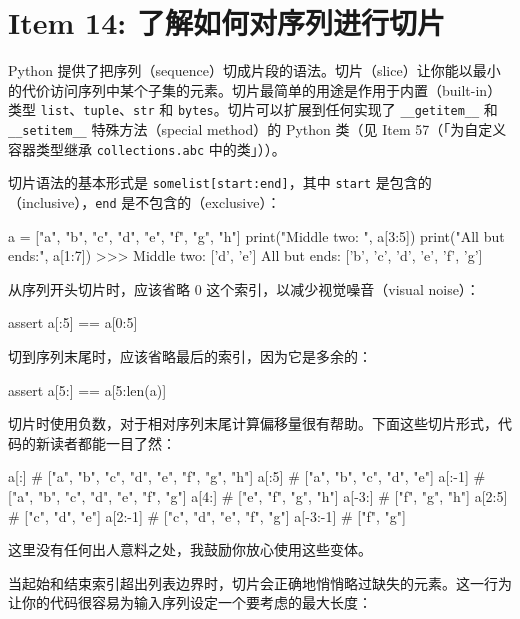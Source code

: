 \section{Item 14: 了解如何对序列进行切片}

Python 提供了把序列（sequence）切成片段的语法。切片（slice）让你能以最小的代价访问序列中某个子集的元素。切片最简单的用途是作用于内置（built-in）类型 \texttt{list}、\texttt{tuple}、\texttt{str} 和 \texttt{bytes}。切片可以扩展到任何实现了 \texttt{\_\_getitem\_\_} 和 \texttt{\_\_setitem\_\_} 特殊方法（special method）的 Python 类（见 Item 57（「为自定义容器类型继承 \texttt{collections.abc} 中的类」））。

切片语法的基本形式是 \texttt{somelist[start:end]}，其中 \texttt{start} 是包含的（inclusive），\texttt{end} 是不包含的（exclusive）：

\begin{codebox}[python]
a = ["a", "b", "c", "d", "e", "f", "g", "h"]
print("Middle two:  ", a[3:5])
print("All but ends:", a[1:7])
>>>
Middle two:   ['d', 'e']
All but ends: ['b', 'c', 'd', 'e', 'f', 'g']
\end{codebox}

从序列开头切片时，应该省略 0 这个索引，以减少视觉噪音（visual noise）：

\begin{codebox}[python]
assert a[:5] == a[0:5]
\end{codebox}

切到序列末尾时，应该省略最后的索引，因为它是多余的：

\begin{codebox}[python]
assert a[5:] == a[5:len(a)]
\end{codebox}

切片时使用负数，对于相对序列末尾计算偏移量很有帮助。下面这些切片形式，代码的新读者都能一目了然：

\begin{codebox}[python]
a[:]      # ["a", "b", "c", "d", "e", "f", "g", "h"]
a[:5]     # ["a", "b", "c", "d", "e"]
a[:-1]    # ["a", "b", "c", "d", "e", "f", "g"]
a[4:]     #                     ["e", "f", "g", "h"]
a[-3:]    #                          ["f", "g", "h"]
a[2:5]    #           ["c", "d", "e"]
a[2:-1]   #           ["c", "d", "e", "f", "g"]
a[-3:-1]  #                          ["f", "g"]
\end{codebox}

这里没有任何出人意料之处，我鼓励你放心使用这些变体。

当起始和结束索引超出列表边界时，切片会正确地悄悄略过缺失的元素。这一行为让你的代码很容易为输入序列设定一个要考虑的最大长度：

